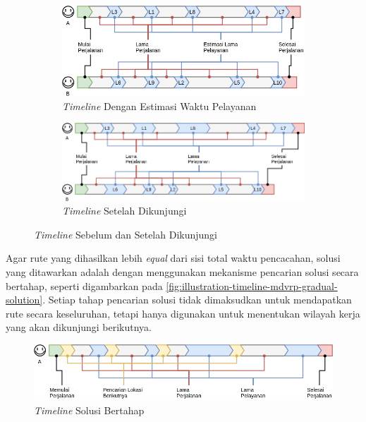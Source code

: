\begin{figure}[!]
	\centering
	\begin{subfigure}[t]{12.5cm}
		\centering
		\includegraphics[width=\textwidth]{Resources/Images/illustration-timeline-mdvrp-timeservice-estimation}
		\caption{\textit{Timeline} Dengan Estimasi Waktu Pelayanan}
		\label{fig:illustration-timeline-mdvrp-timeservice-estimation}
	\end{subfigure}%
	
	\begin{subfigure}[t]{\textwidth}
		\centering
		\includegraphics[width=\textwidth]{Resources/Images/illustration-timeline-mdvrp-timeservice-real}
		\caption{\textit{Timeline} Setelah Dikunjungi}
		\label{fig:illustration-timeline-mdvrp-timeservice-real}
	\end{subfigure}%
	\caption{\textit{Timeline} Sebelum dan Setelah Dikunjungi}
	\label{fig:illustration-timeline-mdvrp}
\end{figure}


Agar rute yang dihasilkan lebih \textit{equal} dari sisi total waktu pencacahan, solusi yang ditawarkan adalah dengan menggunakan mekanisme pencarian solusi secara bertahap, seperti digambarkan pada \autoref{fig:illustration-timeline-mdvrp-gradual-solution}. Setiap tahap pencarian solusi tidak dimaksudkan untuk mendapatkan rute secara keseluruhan, tetapi hanya digunakan untuk menentukan wilayah kerja yang akan dikunjungi berikutnya.


\begin{figure}[!]
	\centering
	\includegraphics[width=\textwidth]{Resources/Images/illustration-timeline-mdvrp-gradual-solution}
	\caption{\textit{Timeline} Solusi Bertahap}
	\label{fig:illustration-timeline-mdvrp-gradual-solution}
\end{figure}


